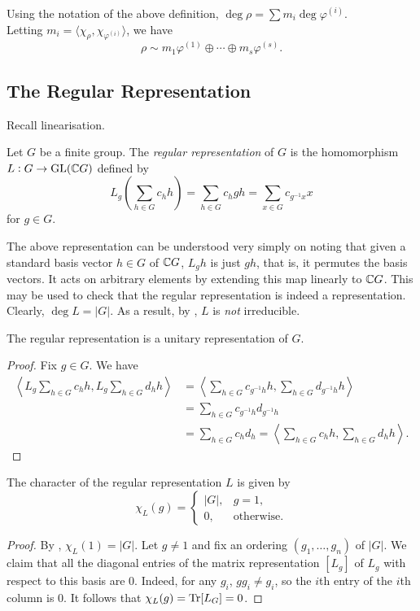		Using the notation of the above definition, $\deg \rho = \sum m_i \deg \varphi^{(i)}$.\\
		Letting $m_i = \langle \chi_\rho , \chi_{\varphi^{(i)}} \rangle$, we have
		\[ \rho \sim m_1 \varphi^{(1)} \oplus \cdots \oplus m_s \varphi^{(s)}. \]


	\subsection{The Regular Representation}

		Recall linearisation.

		\begin{fdef}
			Let $G$ be a finite group. The \emph{regular representation} of $G$ is the homomorphism $L : G \to \operatorname{GL}(\mathbb{C} G)$ defined by
			\[ L_g \left( \sum_{h \in G} c_h h \right) = \sum_{h \in G} c_h gh = \sum_{x \in G} c_{g^{-1}x} x \]
			for $g \in G$.
		\end{fdef}

		The above representation can be understood very simply on noting that given a standard basis vector $h \in G$ of $\mathbb{C} G$, $L_g h$ is just $gh$, that is, it permutes the basis vectors. It acts on arbitrary elements by extending this map linearly to $\mathbb{C} G$. This may be used to check that the regular representation is indeed a representation. \\
		Clearly, $\deg L = |G|$. As a result, by , $L$ is \emph{not} irreducible.

		\begin{fprop}
			The regular representation is a unitary representation of $G$.
		\end{fprop}
		\begin{proof}
			Fix $g \in G$. We have
			\begin{align*}
				\left\langle L_g \sum_{h \in G} c_h h , L_g \sum_{h \in G} d_h h \right\rangle &= \left\langle \sum_{h \in G} c_{g^{-1}h} h , \sum_{h \in G} d_{g^{-1}h} h \right\rangle \\
					&= \sum_{h \in G} c_{g^{-1} h} d_{g^{-1} h} \\
					&= \sum_{h \in G} c_h d_h = \left\langle \sum_{h \in G} c_h h , \sum_{h \in G} d_h h \right\rangle.
			\end{align*}
		\end{proof}

		\begin{fprop}
			The character of the regular representation $L$ is given by
			\[ \chi_L(g) = \begin{cases} |G| , & g = 1, \\ 0 , & \text{otherwise.} \end{cases} \]
		\end{fprop}
		\begin{proof}
			By , $\chi_L(1) = |G|$. Let $g \ne 1$ and fix an ordering $(g_1,\ldots,g_n)$ of $|G|$. We claim that all the diagonal entries of the matrix representation $[L_g]$ of $L_g$ with respect to this basis are $0$. Indeed, for any $g_i$, $gg_i \ne g_i$, so the $i$th entry of the $i$th column is $0$. It follows that $\chi_L(g) = \operatorname{Tr} [L_G] = 0$.
		\end{proof}

